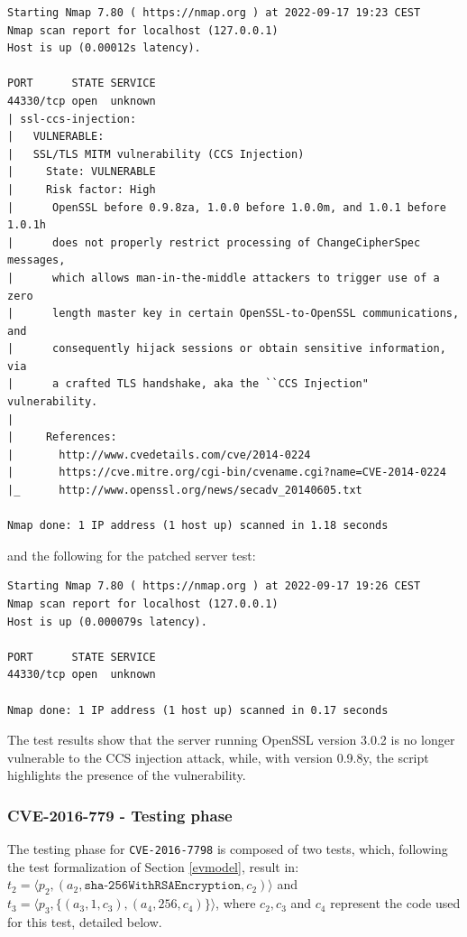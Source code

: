 \begin{verbatim}
Starting Nmap 7.80 ( https://nmap.org ) at 2022-09-17 19:23 CEST
Nmap scan report for localhost (127.0.0.1)
Host is up (0.00012s latency).

PORT      STATE SERVICE
44330/tcp open  unknown
| ssl-ccs-injection: 
|   VULNERABLE:
|   SSL/TLS MITM vulnerability (CCS Injection)
|     State: VULNERABLE
|     Risk factor: High
|      OpenSSL before 0.9.8za, 1.0.0 before 1.0.0m, and 1.0.1 before 1.0.1h
|      does not properly restrict processing of ChangeCipherSpec messages,
|      which allows man-in-the-middle attackers to trigger use of a zero
|      length master key in certain OpenSSL-to-OpenSSL communications, and
|      consequently hijack sessions or obtain sensitive information, via
|      a crafted TLS handshake, aka the ``CCS Injection" vulnerability.
|           
|     References:
|       http://www.cvedetails.com/cve/2014-0224
|       https://cve.mitre.org/cgi-bin/cvename.cgi?name=CVE-2014-0224
|_      http://www.openssl.org/news/secadv_20140605.txt

Nmap done: 1 IP address (1 host up) scanned in 1.18 seconds
\end{verbatim}

and the following for the patched server test:
\begin{verbatim}
Starting Nmap 7.80 ( https://nmap.org ) at 2022-09-17 19:26 CEST
Nmap scan report for localhost (127.0.0.1)
Host is up (0.000079s latency).

PORT      STATE SERVICE
44330/tcp open  unknown

Nmap done: 1 IP address (1 host up) scanned in 0.17 seconds
\end{verbatim}

The test results show that the server running OpenSSL version 3.0.2 is no longer vulnerable to the CCS injection attack, while, with version 0.9.8y, the script highlights the presence of the vulnerability.


\subsubsection{CVE-2016-779 - Testing phase}
The testing phase for \texttt{CVE-2016-7798} is composed of two tests, which, following the test formalization of Section \ref{evmodel}, result in: \(t_2 = \langle p_2, (a_2, \texttt{sha-256WithRSAEncryption}, c_2) \rangle\) and \(t_3 = \langle p_3, \{(a_3, 1, c_3), (a_4, 256, c_4)\}  \rangle\), where \(c_2, c_3\) and \(c_4\) represent the code used for this test, detailed below.

